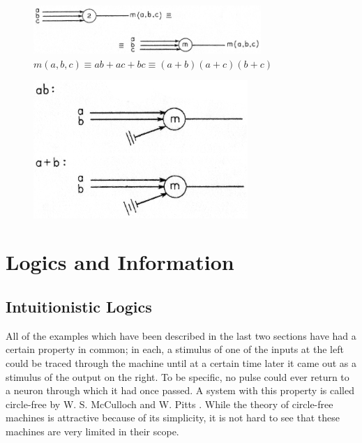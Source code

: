 \documentclass[twocolumn,preprintnumbers,amsmath,amssymb,floatfix]{revtex4}
\begin{document}
\begin{figure}[b]
\includegraphics[width=3.4in]{fig_14}
\caption{\label{fig:14}$m(a,b,c)\equiv ab+ac+bc\equiv
(a+b)(a+c)(b+c)$}
\end{figure}

\begin{figure}
\includegraphics[width=3.2in]{fig_15}
\caption{\label{fig:15}}
\end{figure}

\section{\label{sec:five}Logics and Information}

\subsection{\label{sec:five1}Intuitionistic Logics}

All of the examples which have been described in the last two
sections have had a certain property in common; in each, a
stimulus of one of the inputs at the left could be traced through
the machine until at a certain time later it came out as a
stimulus of the output on the right. To be specific, no pulse
could ever return to a neuron through which it had once passed. A
system with this property is called circle-free by W. S. McCulloch
and W. Pitts \cite{McCulloch43}. While the theory of circle-free
machines is attractive because of its simplicity, it is not hard
to see that these machines are very limited in their scope.
\end{document}
